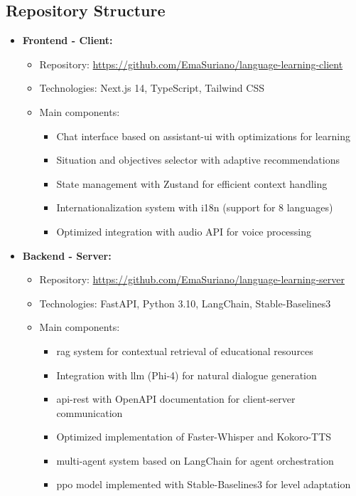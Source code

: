\subsection{Repository Structure}
\label{subsec:estructura-repositorios}

\begin{itemize}
    \item \textbf{Frontend - Client:}
    \begin{itemize}
        \item Repository: \url{https://github.com/EmaSuriano/language-learning-client}
        \item Technologies: Next.js 14, TypeScript, Tailwind CSS
        \item Main components:
              \begin{itemize}
                  \item Chat interface based on \gls{assistant-ui} with optimizations for learning
                  \item Situation and objectives selector with adaptive recommendations
                  \item State management with Zustand for efficient context handling
                  \item Internationalization system with i18n (support for 8 languages)
                  \item Optimized integration with audio API for voice processing
              \end{itemize}
    \end{itemize}

    \item \textbf{Backend - Server:}
    \begin{itemize}
        \item Repository: \url{https://github.com/EmaSuriano/language-learning-server}
        \item Technologies: FastAPI, Python 3.10, LangChain, Stable-Baselines3
        \item Main components:
              \begin{itemize}
                  \item \gls{rag} system for contextual retrieval of educational resources
                  \item Integration with \gls{llm} (Phi-4) for natural dialogue generation
                  \item \gls{api-rest} with OpenAPI documentation for client-server communication
                  \item Optimized implementation of Faster-Whisper and Kokoro-TTS
                  \item \gls{multi-agent} system based on LangChain for agent orchestration
                  \item \gls{ppo} model implemented with Stable-Baselines3 for level adaptation
              \end{itemize}
    \end{itemize}
\end{itemize}

